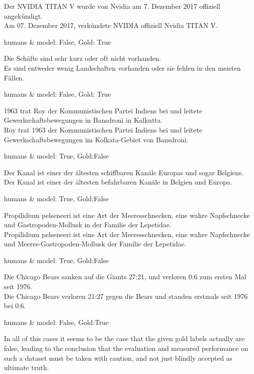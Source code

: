 
\begin{examples}
  \item Der NVIDIA TITAN V wurde von Nvidia am 7. Dezember 2017 offiziell angekündigt.\\
        Am 07. Dezember 2017, verkündete NVIDIA offiziell Nvidia TITAN V.

        humans \& model: False, Gold: True
  \item Die Schäfte sind sehr kurz oder oft nicht vorhanden.\\
        Es sind entweder wenig Landschaften vorhanden oder sie fehlen in den meisten Fällen.

        humans \& model: False, Gold: True
  \item 1963 trat Roy der Kommunistischen Partei Indiens bei und leitete Gewerkschaftsbewegungen in Bansdroni in Kalkutta.\\
        Roy trat 1963 der Kommunistischen Partei Indiens bei und leitete Gewerkschaftsbewegungen im Kolkata-Gebiet von Bansdroni.

        humans \& model: True, Gold:False
  \item Der Kanal ist einer der ältesten schiffbaren Kanäle Europas und sogar Belgiens.\\
        Der Kanal ist einer der ältesten befahrbaren Kanäle in Belgien und Europa.

        humans \& model: True, Gold:False
  \item Propilidium pelseneeri ist eine Art der Meeresschnecken, eine wahre Napfschnecke und Gastropoden-Mollusk in der Familie der Lepetidae.\\
        Propilidium pelseneeri ist eine Art der Meeresschnecken, eine wahre Napfschnecke und Meeres-Gastropoden-Mollusk der Familie der Lepetidae.

        humans \& model: True, Gold:False
  \item Die Chicago Bears sanken auf die Giants 27:21, und verloren 0:6 zum ersten Mal seit 1976.\\
        Die Chicago Bears verloren 21:27 gegen die Bears und standen erstmals seit 1976 bei 0:6.

        humans \& model: False, Gold:True
\end{examples}

In all of this cases it seems to be the case that the given gold labels actually are false,
leading to the conclusion that the evaluation and measured performance on such a dataset must
be taken with caution, and not just blindly accepted as ultimate truth.


